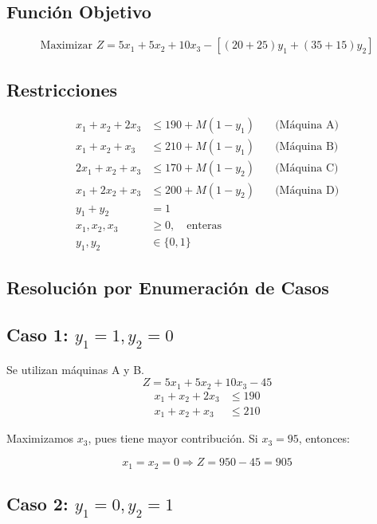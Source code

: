 \documentclass[12pt, a4paper, oneside]{book}
\theoremstyle{definition}
\begin{document}
\subsection{Función Objetivo}

\[
\text{Maximizar } Z = 5x_1 + 5x_2 + 10x_3 - \left[ (20 + 25)y_1 + (35 + 15)y_2 \right]
\]

\subsection{Restricciones}

\begin{align*}
x_1 + x_2 + 2x_3 &\leq 190 + M(1 - y_1) \quad &\text{(Máquina A)} \\
x_1 + x_2 + x_3 &\leq 210 + M(1 - y_1) \quad &\text{(Máquina B)} \\
2x_1 + x_2 + x_3 &\leq 170 + M(1 - y_2) \quad &\text{(Máquina C)} \\
x_1 + 2x_2 + x_3 &\leq 200 + M(1 - y_2) \quad &\text{(Máquina D)} \\
y_1 + y_2 &= 1 \\
x_1, x_2, x_3 &\geq 0,\quad \text{enteras} \\
y_1, y_2 &\in \{0,1\}
\end{align*}

\subsection{Resolución por Enumeración de Casos}

\subsection{Caso 1: \(y_1 = 1, y_2 = 0\)}

Se utilizan máquinas A y B.  
\[
Z = 5x_1 + 5x_2 + 10x_3 - 45
\]
\[
\begin{aligned}
x_1 + x_2 + 2x_3 &\leq 190 \\
x_1 + x_2 + x_3 &\leq 210
\end{aligned}
\]

Maximizamos \(x_3\), pues tiene mayor contribución. Si \(x_3 = 95\), entonces:

\[
x_1 = x_2 = 0 \Rightarrow Z = 950 - 45 = 905
\]

\subsection{Caso 2: \(y_1 = 0, y_2 = 1\)}
\end{document}
